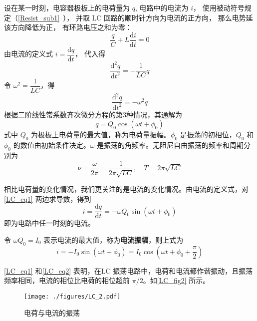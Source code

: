 设在某一时刻，电容器极板上的电荷量为 $q$, 电路中的电流为 $i$， 使用被动符号规定（\autoref{Resist_sub1}~）， 并取 LC 回路的顺时针方向为电流的正方向， 那么电势延该方向降低为正， 有环路电压之和为零：
\begin{equation}
\frac{q}{C} + L \frac{\mathrm{d} i}{\mathrm{d} t} = 0
\end{equation}
由电流的定义式 $i=\dfrac{\mathrm{d} q}{\mathrm{d} t}$， 代入得
\begin{equation}
\frac{\mathrm{d}^{2} q}{\mathrm{d} t^{2}}=-\frac{1}{L C} q
\end{equation}
令 $\omega^{2}=\dfrac{1}{L C}$，得
\begin{equation}
\frac{\mathrm{d}^{2} q}{\mathrm{d} t^{2}}=-\omega^{2} q
\end{equation}
根据二阶线性常系数齐次微分方程的第3种情况，其通解为
\begin{equation} \label{LC_eq1}
q=Q_{0} \cos \left(\omega t+\phi_{0}\right)
\end{equation}
式中 $Q_0$ 为极板上电荷量的最大值，称为电荷量振幅。$\phi_0$ 是振荡的初相位，$Q_0$ 和 $\phi_0$ 的数值由初始条件决定。$\omega$ 是振荡的角频率。无阻尼自由振荡的频率和周期分别为
\begin{equation}
\nu=\frac{\omega}{2 \pi}=\frac{1}{2 \pi \sqrt{L C}}, \quad T=2 \pi \sqrt{L C}
\end{equation}

相比电荷量的变化情况，我们更关注的是电流的变化情况。由电流的定义式，对\autoref{LC_eq1} 两边求导数，得到
\begin{equation}
i=\frac{\mathrm{d} q}{\mathrm{d} t}=-\omega Q_{0} \sin \left(\omega t+\phi_{0}\right)
\end{equation}
即为电路中任一时刻的电流。

令 $\omega Q_0=I_0$ 表示电流的最大值，称为\textbf{电流振幅}，则上式为
\begin{equation} \label{LC_eq2}
i=-I_{0} \sin \left(\omega t+\phi_{0}\right)=I_{0} \cos \left(\omega t+\phi_{0}+\frac{\pi}{2}\right)
\end{equation}

\autoref{LC_eq1} 和\autoref{LC_eq2} 表明，在LC 振荡电路中，电荷和电流都作谐振动，且振荡频率相同，电流的相位比电荷的相位超前 $\pi/2$。如\autoref{LC_fig2} 所示。

\begin{figure}[ht]
\centering
\texttt{[image: ./figures/LC\_2.pdf]}
\caption{电荷与电流的振荡} \label{LC_fig2}
\end{figure}

